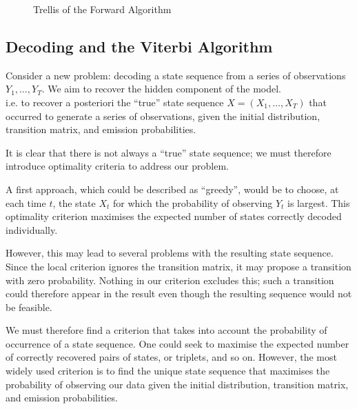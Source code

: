 \documentclass[11pt]{article}
\begin{document}
\begin{figure}[H]
{
}
\vspace{0.35cm}
\caption{Trellis of the Forward Algorithm}
\label{fig:treillis-forward}
\end{figure}


\subsection{Decoding and the Viterbi Algorithm}

Consider a new problem: decoding a state sequence from a series of observations $Y_1,\dots,Y_T$.
We aim to recover the hidden component of the model.\\
i.e. to recover a posteriori the ``true'' state sequence $X = (X_1, \dots, X_T)$ that occurred to generate a series of observations, given the initial distribution, transition matrix, and emission probabilities.

It is clear that there is not always a ``true'' state sequence; we must therefore introduce optimality criteria to address our problem.

A first approach, which could be described as ``greedy'', would be to choose, at each time $t$, the state $X_t$ for which the probability of observing $Y_t$ is largest.
This optimality criterion maximises the expected number of states correctly decoded individually.

However, this may lead to several problems with the resulting state sequence. Since the local criterion ignores the transition matrix, it may propose a transition with zero probability.
Nothing in our criterion excludes this; such a transition could therefore appear in the result even though the resulting sequence would not be feasible.

We must therefore find a criterion that takes into account the probability of occurrence of a state sequence. One could seek to maximise the expected number of correctly recovered pairs of states, or triplets, and so on.
However, the most widely used criterion is to find the unique state sequence that maximises the probability of observing our data given the initial distribution, transition matrix, and emission probabilities.
\end{document}
